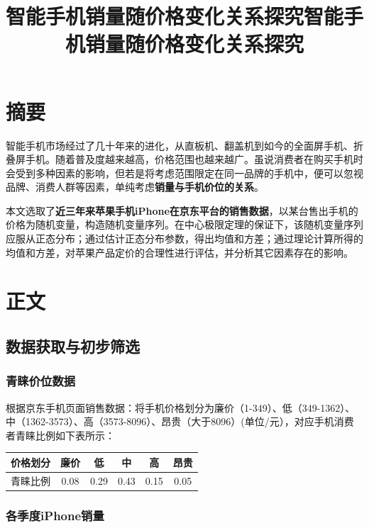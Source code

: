 \documentclass[12pt]{ctexart}
\title{智能手机销量随价格变化关系探究}
\begin{document}
\title{智能手机销量随价格变化关系探究}                                  

\section{摘要}

    智能手机市场经过了几十年来的进化，从直板机、翻盖机到如今的全面屏手机、折叠屏手机。随着普及度越来越高，价格范围也越来越广。虽说消费者在购买手机时会受到多种因素的影响，但若是将考虑范围限定在同一品牌的手机中，便可以忽视品牌、消费人群等因素，单纯考虑\textbf{销量与手机价位的关系}。

    本文选取了\textbf{近三年来苹果手机iPhone在京东平台的销售数据}，以某台售出手机的价格为随机变量，构造随机变量序列。在中心极限定理的保证下，该随机变量序列应服从正态分布；通过估计正态分布参数，得出均值和方差；通过理论计算所得的均值和方差，对苹果产品定价的合理性进行评估，并分析其它因素存在的影响。


\section{正文}

    \subsection{数据获取与初步筛选}

        \subsubsection{青睐价位数据}   

            根据京东手机页面销售数据：将手机价格划分为廉价（1-349）、低（349-1362）、中（1362-3573）、高（3573-8096）、昂贵（大于8096）(单位/元），对应手机消费者青睐比例如下表所示：

            \begin{center}
                \begin{tabular}{|c|ccccc|}
                    \hline
                    价格划分&廉价&低&中&高&昂贵\\
                    \hline
                    青睐比例&0.08&0.29&0.43&0.15&0.05\\
                    \hline
                \end{tabular}
            \end{center}

        \subsubsection{各季度iPhone销量}
\end{document}
